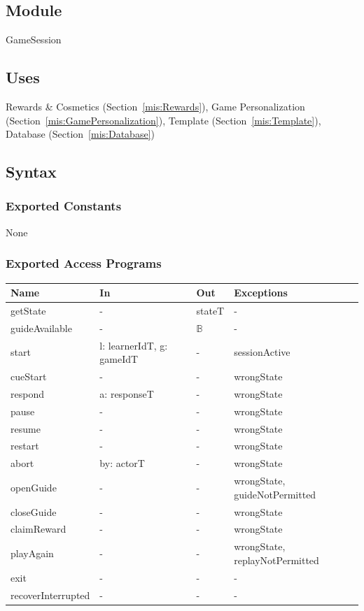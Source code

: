 \documentclass[12pt, titlepage]{article}
\newcommand{\Mref}[1]{Section~\ref{#1}}
\begin{document}
\subsection{Module}

GameSession

\subsection{Uses}

Rewards \& Cosmetics (\Mref{mis:Rewards}), Game Personalization
(\Mref{mis:GamePersonalization}), Template (\Mref{mis:Template}),
Database (\Mref{mis:Database})

\subsection{Syntax}

\subsubsection{Exported Constants}

None

\subsubsection{Exported Access Programs}

\begin{center}
\small
\begin{tabular}{p{3.3cm} p{4.7cm} p{2.6cm} p{2.8cm}}
\hline
\textbf{Name} & \textbf{In} & \textbf{Out} & \textbf{Exceptions} \\
\hline
getState & - & stateT & - \\
guideAvailable & - & $\mathbb{B}$ & - \\
start & l: learnerIdT, g: gameIdT & - & sessionActive \\
cueStart & - & - & wrongState \\
respond & a: responseT & - & wrongState \\
pause & - & - & wrongState \\
resume & - & - & wrongState \\
restart & - & - & wrongState \\
abort & by: actorT & - & wrongState \\
openGuide & - & - & wrongState, guideNotPermitted \\
closeGuide & - & - & wrongState \\
claimReward & - & - & wrongState \\
playAgain & - & - & wrongState, replayNotPermitted \\
exit & - & - & - \\
recoverInterrupted & - & - & - \\
\hline
\end{tabular}
\end{center}
\end{document}
